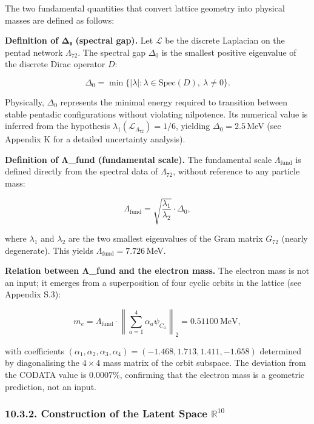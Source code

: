 \documentclass[11pt]{article}
\let\oldmathcal\mathcal
\renewcommand{\mathcal}[1]{\oldmathcal{#1}}
\begin{document}
The two fundamental quantities that convert lattice geometry into
physical masses are defined as follows:

\textbf{Definition of Δ₀ (spectral gap).} Let \(\mathcal{L}\) be the
discrete Laplacian on the pentad network \(\Lambda_{72}\). The spectral
gap \(\Delta_0\) is the smallest positive eigenvalue of the discrete
Dirac operator \(D\):

\[
\Delta_0 = \min\{ |\lambda| : \lambda \in \text{Spec}(D),\ \lambda \neq 0 \}.
\]

Physically, \(\Delta_0\) represents the minimal energy required to
transition between stable pentadic configurations without violating
nilpotence. Its numerical value is inferred from the hypothesis
\(\lambda_1(\mathcal{L}_{\Lambda_{72}}) = 1/6\), yielding
\(\Delta_0 = 2.5\)\,MeV (see Appendix K for a detailed uncertainty
analysis).

\textbf{Definition of Λ\_fund (fundamental scale).} The fundamental
scale \(\Lambda_{\text{fund}}\) is defined directly from the spectral
data of \(\Lambda_{72}\), without reference to any particle mass:

\[
\Lambda_{\text{fund}} = \sqrt{\frac{\lambda_1}{\lambda_2}} \cdot \Delta_0,
\]

where \(\lambda_1\) and \(\lambda_2\) are the two smallest eigenvalues
of the Gram matrix \(G_{72}\) (nearly degenerate). This yields
\(\Lambda_{\text{fund}} = 7.726\)\,MeV.

\textbf{Relation between Λ\_fund and the electron mass.} The electron
mass is not an input; it emerges from a superposition of four cyclic
orbits in the lattice (see Appendix S.3):

\[
m_e = \Lambda_{\text{fund}} \cdot \left\| \sum_{a=1}^{4} \alpha_a \psi_{C_a} \right\|_2 = 0.51100\ \text{MeV},
\]

with coefficients
\((\alpha_1,\alpha_2,\alpha_3,\alpha_4) = (-1.468, 1.713, 1.411, -1.658)\)
determined by diagonalising the \(4\times4\) mass matrix of the orbit
subspace. The deviation from the CODATA value is \(0.0007\%\),
confirming that the electron mass is a geometric prediction, not an
input.

\hypertarget{construction-of-the-latent-space-mathbbr10}{%
\subsubsection{\texorpdfstring{10.3.2. Construction of the Latent Space
\(\mathbb{R}^{10}\)}{10.3.2. Construction of the Latent Space \textbackslash mathbb\{R\}\^{}\{10\}}}\label{construction-of-the-latent-space-mathbbr10}}
\end{document}
